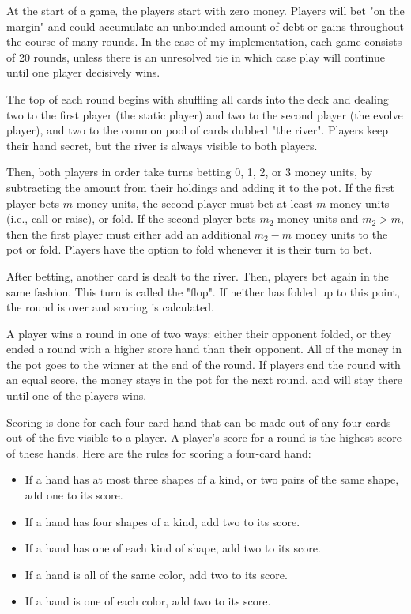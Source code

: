 \documentclass[11pt]{article}
\begin{document}
At the start of a game, the players start with zero money. Players will bet "on the margin" and could accumulate an unbounded amount of debt or gains throughout the course of many rounds. In the case of my implementation, each game consists of 20 rounds, unless there is an unresolved tie in which case play will continue until one player decisively wins.

The top of each round begins with shuffling all cards into the deck and dealing two to the first player (the static player) and two to the second player (the evolve player), and two to the common pool of cards dubbed "the river". Players keep their hand secret, but the river is always visible to both players.

Then, both players in order take turns betting 0, 1, 2, or 3 money units, by subtracting the amount from their holdings and adding it to the pot. If the first player bets $m$ money units, the second player must bet at least $m$ money units (i.e., call or raise), or fold. If the second player bets $m_2$ money units and $m_2 > m$, then the first player must either add an additional $m_2-m$ money units to the pot or fold. Players have the option to fold whenever it is their turn to bet.

After betting, another card is dealt to the river. Then, players bet again in the same fashion. This turn is called the "flop". If neither has folded up to this point, the round is over and scoring is calculated.

A player wins a round in one of two ways: either their opponent folded, or they ended a round with a higher score hand than their opponent. All of the money in the pot goes to the winner at the end of the round. If players end the round with an equal score, the money stays in the pot for the next round, and will stay there until one of the players wins.

Scoring is done for each four card hand that can be made out of any four cards out of the five visible to a player. A player's score for a round is the highest score of these hands. Here are the rules for scoring a four-card hand:
\begin{itemize}
    \item If a hand has at most three shapes of a kind, or two pairs of the same shape, add one to its score.
	\item If a hand has four shapes of a kind, add two to its score.
	\item If a hand has one of each kind of shape, add two to its score. 
	\item If a hand is all of the same color, add two to its score.
	\item If a hand is one of each color, add two to its score.
\end{itemize}
\end{document}
